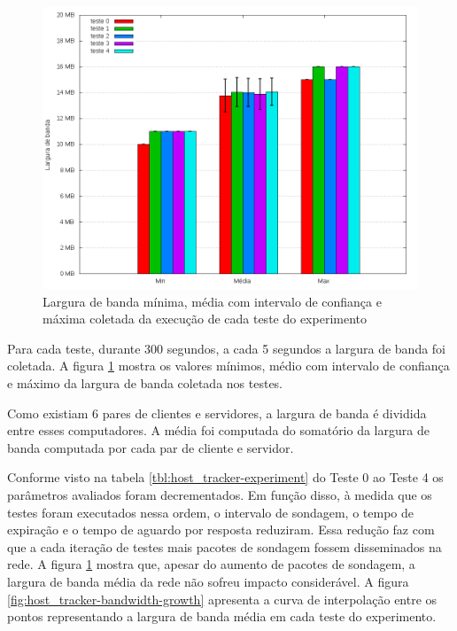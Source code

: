 \begin{figure}[!htb]
    \centering
    \label{fig:host_tracker-bandwidth}
    \includegraphics[width=\linewidth]{img/host_tracker-bandwidth}
    \caption{Largura de banda mínima, média com intervalo de confiança e máxima
    coletada da execução de cada teste do experimento}
\end{figure}

Para cada teste, durante 300 segundos, a cada 5 segundos a largura de banda
foi coletada.
A figura \ref{fig:host_tracker-bandwidth} mostra os valores mínimos, médio 
com intervalo de confiança e máximo da largura de banda coletada nos testes.

Como existiam 6 pares de clientes e servidores, a largura de banda é 
dividida entre esses computadores.
A média foi computada do somatório da largura de banda computada por cada 
par de cliente e servidor.

Conforme visto na tabela \ref{tbl:host_tracker-experiment} do Teste 0 ao 
Teste 4 os parâmetros avaliados foram decrementados. 
Em função disso, à medida que os testes foram executados nessa ordem, 
o intervalo de sondagem, o tempo de expiração e o tempo de aguardo por 
resposta reduziram. 
Essa redução faz com que a cada iteração de testes mais pacotes de sondagem
fossem disseminados na rede.
A figura \ref{fig:host_tracker-bandwidth} mostra que, apesar do aumento de 
pacotes de sondagem, a largura de banda média da rede não sofreu impacto 
considerável.
A figura \ref{fig:host_tracker-bandwidth-growth} apresenta a curva de 
interpolação entre os pontos representando a largura de banda média em cada 
teste do experimento.

